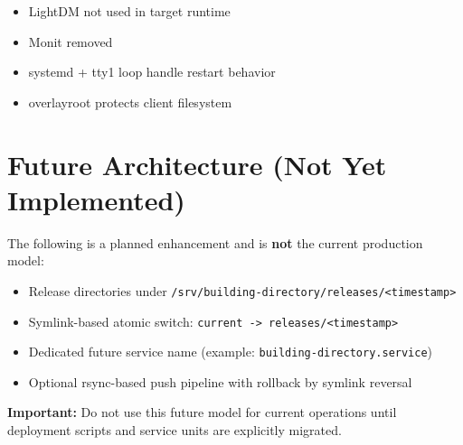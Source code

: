 \documentclass[11pt,letterpaper]{article}
\begin{document}
\begin{itemize}
\item LightDM not used in target runtime
\item Monit removed
\item systemd + tty1 loop handle restart behavior
\item overlayroot protects client filesystem
\end{itemize}

\section{Future Architecture (Not Yet Implemented)}

The following is a planned enhancement and is \textbf{not} the current production model:

\begin{itemize}
\item Release directories under \texttt{/srv/building-directory/releases/<timestamp>}
\item Symlink-based atomic switch: \texttt{current -> releases/<timestamp>}
\item Dedicated future service name (example: \texttt{building-directory.service})
\item Optional rsync-based push pipeline with rollback by symlink reversal
\end{itemize}

\textbf{Important:} Do not use this future model for current operations until deployment scripts and service units are explicitly migrated.
\end{document}
